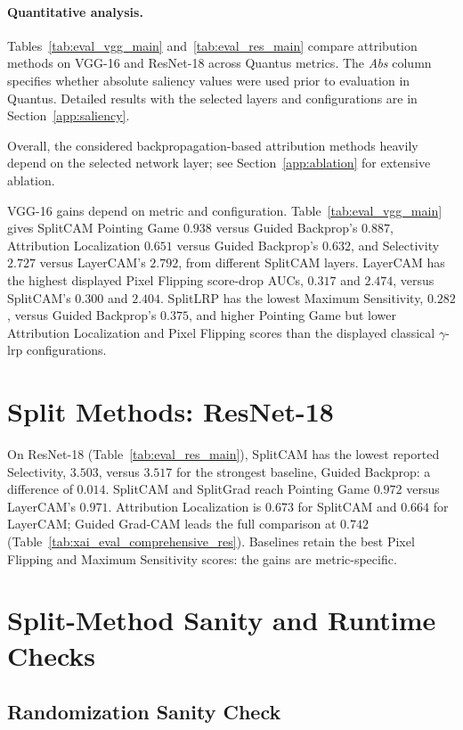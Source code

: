 \paragraph{Quantitative analysis.}
Tables~\ref{tab:eval_vgg_main} and~\ref{tab:eval_res_main} compare attribution methods on VGG-16 and ResNet-18 across Quantus metrics. The \emph{Abs} column specifies whether absolute saliency values were used prior to evaluation in Quantus. Detailed results with the selected layers and configurations are in Section~\ref{app:saliency}.

Overall, the considered backpropagation-based attribution methods heavily depend on the selected network layer; see Section~\ref{app:ablation} for extensive ablation.

VGG-16 gains depend on metric and configuration. Table~\ref{tab:eval_vgg_main} gives SplitCAM Pointing Game $0.938$ versus Guided Backprop's $0.887$, Attribution Localization $0.651$ versus Guided Backprop's $0.632$, and Selectivity $2.727$ versus LayerCAM's $2.792$, from different SplitCAM layers. LayerCAM has the highest displayed Pixel Flipping score-drop AUCs, $0.317$ and $2.474$, versus SplitCAM's $0.300$ and $2.404$. SplitLRP has the lowest Maximum Sensitivity, $0.282$, versus Guided Backprop's $0.375$, and higher Pointing Game but lower Attribution Localization and Pixel Flipping scores than the displayed classical $\gamma$-\ac{lrp} configurations.

\section{Split Methods: ResNet-18}\label{sec:results_resnet}

On ResNet-18 (Table~\ref{tab:eval_res_main}), SplitCAM has the lowest reported Selectivity, $3.503$, versus $3.517$ for the strongest baseline, Guided Backprop: a difference of $0.014$. SplitCAM and SplitGrad reach Pointing Game $0.972$ versus LayerCAM's $0.971$. Attribution Localization is $0.673$ for SplitCAM and $0.664$ for LayerCAM; Guided Grad-CAM leads the full comparison at $0.742$ (Table~\ref{tab:xai_eval_comprehensive_res}). Baselines retain the best Pixel Flipping and Maximum Sensitivity scores: the gains are metric-specific.

\section{Split-Method Sanity and Runtime Checks}

\subsection{Randomization Sanity Check}\label{app:p1_sanity}

